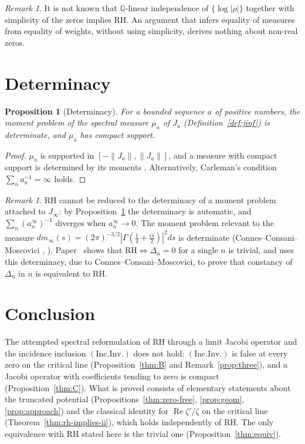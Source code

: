 \documentclass[11pt]{amsart}
\newtheorem{proposition}[theorem]{Proposition}
\theoremstyle{definition}
\theoremstyle{remark}
\newtheorem{remark}[theorem]{Remark}
\newtheorem*{remark*}{Remark}
\newcommand{\RH}{\mathrm{RH}}
\renewcommand{\Re}{\operatorname{Re}}
\newcommand{\Jinf}{J_\infty}
\newcommand{\incInv}{(\mathrm{Inc.Inv.})}
\begin{document}
\begin{remark}\label{thm:E}
It is not known that $\mathbb Q$-linear independence of $\{\log|\rho|\}$ together with simplicity
of the zeros implies $\RH$. An argument that infers equality of measures from equality of
weights, without using simplicity, derives nothing about non-real zeros.
\end{remark}

\section{Determinacy}\label{sec:gap}

\begin{proposition}[Determinacy]\label{prop:moment}
For a bounded sequence $a$ of positive numbers, the moment problem of the spectral measure
$\mu_a$ of $J_a$ (Definition~\ref{def:jinf}) is determinate, and $\mu_a$ has compact support.
\end{proposition}
\begin{proof}
$\mu_a$ is supported in $[-\|J_a\|,\|J_a\|]$, and a measure with compact support is determined
by its moments \cite[Ch.~2]{Akhiezer}. Alternatively, Carleman's condition
$\sum_n a_n^{-1}=\infty$ holds.
\end{proof}

\begin{remark*}
$\RH$ cannot be reduced to the determinacy of a moment problem attached to $\Jinf$: by
Proposition~\ref{prop:moment} the determinacy is automatic, and $\sum_n(a_n^\infty)^{-1}$
diverges when $a_n^\infty\to0$. The moment problem relevant to the measure
$dm_\infty(s)=(2\pi)^{-3/2}|\Gamma(\frac14+\frac{is}2)|^2ds$ is determinate
(Connes--Consani--Moscovici \cite[Prop.~3.3, Thm.~5.2]{CCMprolate},
\cite[Prop.~3.1]{CCMq}). Paper~\cite{MomentRigidity} shows that $\RH\iff\Delta_n=0$ for a single
$n$ is trivial, and uses this determinacy, due to Connes--Consani--Moscovici, to prove that
constancy of $\Delta_n$ in $n$ is equivalent to $\RH$.
\end{remark*}

\section{Conclusion}

The attempted spectral reformulation of $\RH$ through a limit Jacobi operator and the incidence
inclusion $\incInv$ does not hold: $\incInv$ is false at every zero on the critical line
(Proposition~\ref{thm:B} and Remark~\ref{prop:three}), and a Jacobi operator with coefficients
tending to zero is compact (Proposition~\ref{thm:C}). What is proved consists of elementary
statements about the truncated potential (Propositions~\ref{thm:zero-free}, \ref{prop:geom},
\ref{prop:approach}) and the classical identity for $\Re\zeta'/\zeta$ on the critical line
(Theorem~\ref{thm:rh-implies-ii}), which holds independently of $\RH$. The only equivalence with
$\RH$ stated here is the trivial one (Proposition~\ref{thm:equiv}).
\end{document}
